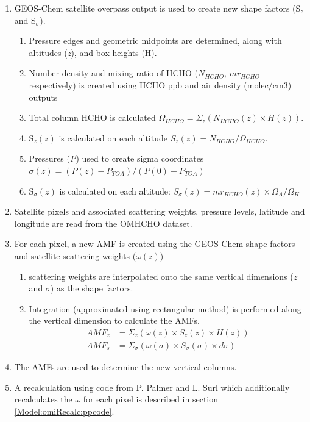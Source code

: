   \begin{enumerate}
    \item GEOS-Chem satellite overpass output is used to create new shape factors (S$_z$ and S$_\sigma$).
    \begin{enumerate}
      \item Pressure edges and geometric midpoints are determined, along with altitudes (\textit{z}), and box heights (H).
      \item Number density and mixing ratio of HCHO ($N_{HCHO}$, $mr_{HCHO}$ respectively) is created using HCHO ppb and air density (molec/cm3) outputs
      \item Total column HCHO is calculated $\Omega_{HCHO} = \Sigma_z \left(N_{HCHO}(z) \times H(z) \right)$.
      \item S$_z(z)$ is calculated on each altitude $S_z(z) = N_{HCHO} / \Omega_{HCHO}$.
      \item Pressures (\textit{P}) used to create sigma coordinates $\sigma(z) = (P(z) - P_{TOA}) / (P(0)-P_{TOA})$
      \item S$_\sigma(z)$ is calculated on each altitude: $S_\sigma(z) = mr_{HCHO}(z) \times \Omega_A / \Omega_H$
    \end{enumerate}
    \item Satellite pixels and associated scattering weights, pressure levels, latitude and longitude are read from the OMHCHO dataset.
    \item For each pixel, a new AMF is created using the GEOS-Chem shape factors and satellite scattering weights ($\omega(z)$)
    \begin{enumerate}
      \item scattering weights are interpolated onto the same vertical dimensions (\textit{z} and $\sigma$) as the shape factors.
      \item Integration (approximated using rectangular method) is performed along the vertical dimension to calculate the AMFs.
      \begin{align}
        AMF_z &= \Sigma_z \left(\omega(z) \times S_z(z) \times H(z)\right) \\
        AMF_s &= \Sigma_{\sigma} \left(\omega(\sigma) \times S_{\sigma}(\sigma) \times d\sigma \right)
      \end{align}
    \end{enumerate}
    \item The AMFs are used to determine the new vertical columns.
    \item A recalculation using code from P. Palmer and L. Surl which additionally recalculates the $\omega$ for each pixel is described in section \ref{Model:omiRecalc:ppcode}.
  \end{enumerate}
  
